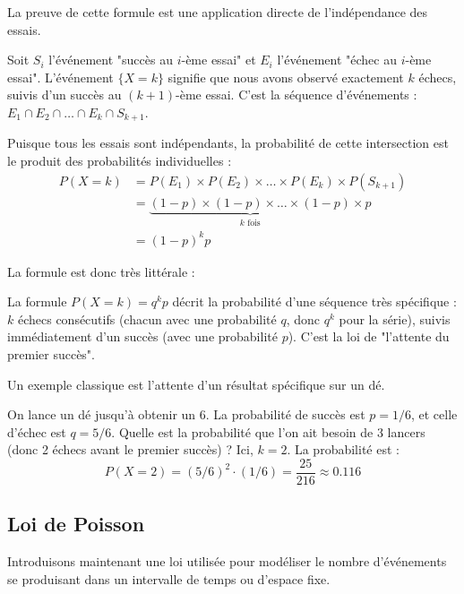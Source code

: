 La preuve de cette formule est une application directe de l'indépendance des essais.

\begin{proofbox}
Soit $S_i$ l'événement "succès au $i$-ème essai" et $E_i$ l'événement "échec au $i$-ème essai".
L'événement $\{X=k\}$ signifie que nous avons observé exactement $k$ échecs, suivis d'un succès au $(k+1)$-ème essai.
C'est la séquence d'événements : $E_1 \cap E_2 \cap \dots \cap E_k \cap S_{k+1}$.

Puisque tous les essais sont indépendants, la probabilité de cette intersection est le produit des probabilités individuelles :
\begin{align*}
P(X=k) &= P(E_1) \times P(E_2) \times \dots \times P(E_k) \times P(S_{k+1}) \\
&= \underbrace{(1-p) \times (1-p) \times \dots \times (1-p)}_{k \text{ fois}} \times p \\
&= (1-p)^k p
\end{align*}
\end{proofbox}

La formule est donc très littérale :

\begin{intuitionbox}
La formule $P(X=k) = q^k p$ décrit la probabilité d'une séquence très spécifique : $k$ échecs consécutifs (chacun avec une probabilité $q$, donc $q^k$ pour la série), suivis immédiatement d'un succès (avec une probabilité $p$). C'est la loi de "l'attente du premier succès".
\end{intuitionbox}

Un exemple classique est l'attente d'un résultat spécifique sur un dé.

\begin{examplebox}
On lance un dé jusqu'à obtenir un 6. La probabilité de succès est $p=1/6$, et celle d'échec est $q=5/6$. Quelle est la probabilité que l'on ait besoin de 3 lancers (donc 2 échecs avant le premier succès) ?
Ici, $k=2$. La probabilité est :
$$ P(X=2) = (5/6)^2 \cdot (1/6) = \frac{25}{216} \approx 0.116 $$
\end{examplebox}

\subsection{Loi de Poisson}

Introduisons maintenant une loi utilisée pour modéliser le nombre d'événements se produisant dans un intervalle de temps ou d'espace fixe.

